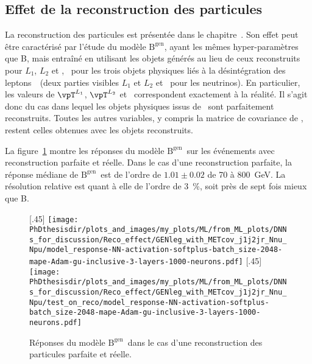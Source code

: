 \subsection{Effet de la reconstruction des particules}
\def\Bgenleg{$\text{B}^\text{gen}$}
La reconstruction des particules est présentée dans le chapitre~.
Son effet peut être caractérisé par l'étude du modèle \Bgenleg,
ayant les mêmes hyper-paramètres que B, mais entraîné en utilisant les objets générés au lieu de ceux reconstruits pour $L_1$, $L_2$ et \MET, \ie\ pour les trois objets physiques liés à la désintégration des leptons~\tau\ (deux parties visibles $L_1$ et $L_2$ et \MET\ pour les neutrinos).
En particulier, les valeurs de $\vpT^{L_1}$, $\vpT^{L_2}$ et \vMET\ correspondent exactement à la réalité.
Il s'agit donc du cas dans lequel les objets physiques issus de \higgsML\ sont parfaitement reconstruits.
Toutes les autres variables, y compris la matrice de covariance de \MET, restent celles obtenues avec les objets reconstruits.
\par
La figure~\ref{fig-reponse_model_1GENleg} montre les réponses du modèle \Bgenleg\ sur les événements avec reconstruction parfaite et réelle.
Dans le cas d'une reconstruction parfaite,
la réponse médiane de \Bgenleg\ est de l'ordre de $\num{1.01}\pm\num{0.02}$ de \num{70} à \SI{800}{\GeV}.
La résolution relative est quant à elle de l'ordre de \SI{3}{\%}, soit près de sept fois mieux que B.
\begin{figure}[h]
\centering

[.45\textwidth]
{\texttt{[image: \\PhDthesisdir/plots\_and\_images/my\_plots/ML/from\_ML\_plots/DNNs\_for\_discussion/Reco\_effect/GENleg\_with\_METcov\_j1j2jr\_Nnu\_Npu/model\_response-NN-activation-softplus-batch\_size-2048-mape-Adam-gu-inclusive-3-layers-1000-neurons.pdf]}\vspace{-.5\baselineskip}}
\hfill
{}[.45\textwidth]
{\texttt{[image: \\PhDthesisdir/plots\_and\_images/my\_plots/ML/from\_ML\_plots/DNNs\_for\_discussion/Reco\_effect/GENleg\_with\_METcov\_j1j2jr\_Nnu\_Npu/test\_on\_reco/model\_response-NN-activation-softplus-batch\_size-2048-mape-Adam-gu-inclusive-3-layers-1000-neurons.pdf]}\vspace{-.5\baselineskip}}

\caption[Réponses du modèle \Bgenleg\ avec reconstruction parfaite ou réelle.]{Réponses du modèle \Bgenleg\ dans le cas d'une reconstruction des particules parfaite et réelle.}
\label{fig-reponse_model_1GENleg}
\end{figure}

